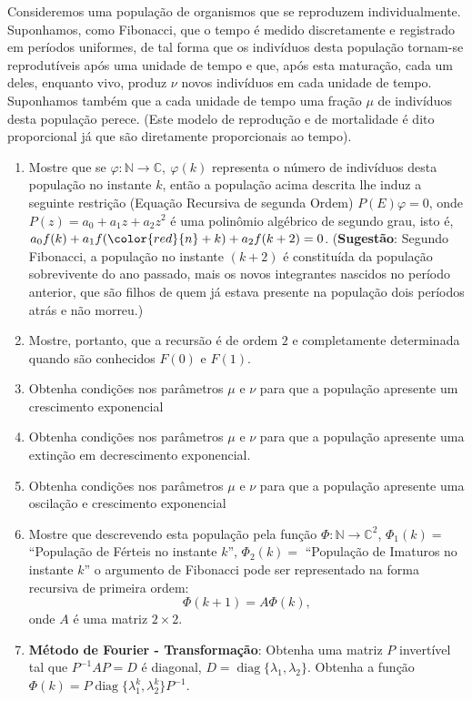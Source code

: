 \begin{exercise}
    Consideremos uma população de organismos que se reproduzem individualmente. Suponhamos, como Fibonacci, que o tempo é medido discretamente e registrado em períodos uniformes, de tal forma que os indivíduos desta população tornam-se reprodutíveis após uma unidade de tempo e que, após esta maturação, cada um deles, enquanto vivo, produz \(\nu\) novos indivíduos em cada unidade de tempo. Suponhamos também que a cada unidade de tempo uma fração \(\mu\) de indivíduos desta população perece. (Este modelo de reprodução e de mortalidade é dito proporcional já que são diretamente proporcionais ao tempo).

\begin{enumerate}
    \item Mostre que se \(\varphi: \mathbb{N} \to \mathbb{C},\ \varphi(k)\) representa o número de indivíduos desta população no instante \(k\), então a população acima descrita lhe induz a seguinte restrição (Equação Recursiva de segunda Ordem) \(P(E) \varphi = 0\), onde \(P(z) = a_0 + a_1 z + a_2 z^2\) é uma polinômio algébrico de segundo grau, isto é, \(a_0f(k) + a_1f(\color{red}{n}+k) + a_2 f(k+2) = 0\). (\textbf{Sugestão}: Segundo Fibonacci, a população no instante \((k+2)\) é constituída da população sobrevivente do ano passado, mais os novos integrantes nascidos no período anterior, que são filhos de quem já estava presente na população dois períodos atrás e não morreu.)
    \item Mostre, portanto, que a recursão é de ordem \(2\) e completamente determinada quando são conhecidos \(F(0)\) e \(F(1)\).
    \item Obtenha condições nos parâmetros \(\mu\) e \(\nu\) para que a população apresente um crescimento exponencial
    \item Obtenha condições nos parâmetros \(\mu\) e \(\nu\) para que a população apresente uma extinção em decrescimento exponencial.
    \item Obtenha condições nos parâmetros \(\mu\) e \(\nu\) para que a população apresente uma oscilação e crescimento exponencial
    \item Mostre que descrevendo esta população pela função \(\Phi: \mathbb{N} \to \mathbb{C}^2\), \(\Phi_1(k) =\) ``População de Férteis no instante \(k\)'', \(\Phi_2(k) =\) ``População de Imaturos no instante \(k\)'' o argumento de Fibonacci pode ser representado na forma recursiva de primeira ordem:
    \[\Phi(k+1) = A \Phi(k),\] onde \(A\) é uma matriz \(2 \times 2\).
    \item \textbf{Método de Fourier - Transformação}: Obtenha uma matriz \(P\) invertível tal que \(P^{-1}A P = D\) é diagonal, \(D = \operatorname{diag}\{\lambda_1, \lambda_2\}\). Obtenha a função \(\Phi(k) = P \operatorname{diag}\{\lambda_1^k, \lambda_2^k\} P^{-1}\).

\end{enumerate}
\end{exercise}
